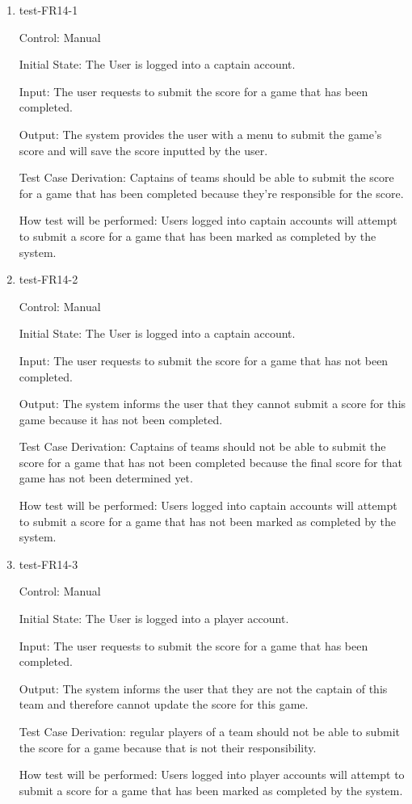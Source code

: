 \documentclass[12pt, titlepage]{article}
\begin{document}
\begin{enumerate}

  \item{test-FR14-1\\}

  Control: Manual

  Initial State: The User is logged into a captain account.

  Input: The user requests to submit the score for a game that has been
  completed.

  Output: The system provides the user with a menu to submit the game's
  score and will save the score inputted by the user.

  Test Case Derivation: Captains of teams should be able to submit the score
  for a game that has been completed because they're responsible for the
  score.

  How test will be performed: Users logged into captain accounts will attempt
  to submit a score for a game that has been marked as completed by the system.

  \item{test-FR14-2\\}

  Control: Manual

  Initial State: The User is logged into a captain account.

  Input: The user requests to submit the score for a game that has not
  been completed.

  Output: The system informs the user that they cannot submit a score
  for this game because it has not been completed.

  Test Case Derivation: Captains of teams should not be able to 
  submit the score for a game that has not been completed because 
  the final score for that game has not been determined yet.

  How test will be performed: Users logged into captain accounts will attempt
  to submit a score for a game that has not been marked as completed by 
  the system.

  \item{test-FR14-3\\}

  Control: Manual

  Initial State: The User is logged into a player account.

  Input: The user requests to submit the score for a game that has
  been completed.

  Output: The system informs the user that they are not the captain 
  of this team and therefore cannot update the score for this game.

  Test Case Derivation: regular players of a team should not be able to 
  submit the score for a game because that is not their responsibility.

  How test will be performed: Users logged into player accounts will 
  attempt to submit a score for a game that has been marked as completed 
  by the system.

\end{enumerate}
\end{document}
